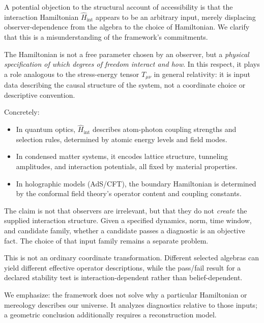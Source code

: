 \documentclass[12pt,a4paper,openany]{book}
\begin{document}
\begin{tcolorbox}[colback=gray!5!white,colframe=black!75!black,title=\textbf{Remark: The Hamiltonian as Physical Input}]
A potential objection to the structural account of accessibility is that the interaction Hamiltonian $\hat{H}_{\text{int}}$ appears to be an arbitrary input, merely displacing observer-dependence from the algebra to the choice of Hamiltonian. We clarify that this is a misunderstanding of the framework's commitments.

The Hamiltonian is not a free parameter chosen by an observer, but a \emph{physical specification of which degrees of freedom interact and how}. In this respect, it plays a role analogous to the stress-energy tensor $T_{\mu\nu}$ in general relativity: it is input data describing the causal structure of the system, not a coordinate choice or descriptive convention.

Concretely:
\begin{itemize}
\item In quantum optics, $\hat{H}_{\text{int}}$ describes atom-photon coupling strengths and selection rules, determined by atomic energy levels and field modes.
\item In condensed matter systems, it encodes lattice structure, tunneling amplitudes, and interaction potentials, all fixed by material properties.
\item In holographic models (AdS/CFT), the boundary Hamiltonian is determined by the conformal field theory's operator content and coupling constants.
\end{itemize}

The claim is not that observers are irrelevant, but that they do not \emph{create} the supplied interaction structure.  Given a specified dynamics, norm, time window, and candidate family, whether a candidate passes a diagnostic is an objective fact.  The choice of that input family remains a separate problem.

This is not an ordinary coordinate transformation.  Different selected algebras can yield different effective operator descriptions, while the pass/fail result for a declared stability test is interaction-dependent rather than belief-dependent.

We emphasize: the framework does not solve why a particular Hamiltonian or mereology describes our universe.  It analyzes diagnostics relative to those inputs; a geometric conclusion additionally requires a reconstruction model.
\end{tcolorbox}
\end{document}
